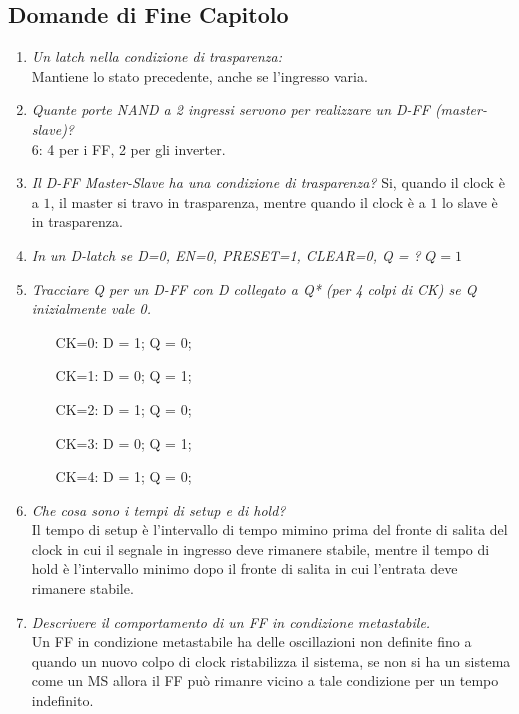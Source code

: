 \documentclass[12pt]{article}
\begin{document}
\subsection{Domande di Fine Capitolo}
\begin{enumerate}
    \item \emph{Un latch nella condizione di trasparenza:} \\
        Mantiene lo stato precedente, anche se l’ingresso varia.

    \item \emph{Quante porte NAND a 2 ingressi servono per realizzare un D-FF (master-slave)?} \\
        6: 4 per i FF, 2 per gli inverter.

    \item \emph{Il D-FF Master-Slave ha una condizione di trasparenza?}
        Si, quando il clock \`e a $1$, il master si travo in trasparenza, mentre quando il clock \`e a $1$ lo slave \`e in trasparenza.

    \item \emph{In un D-latch se D=0, EN=0, PRESET=1, CLEAR=0, Q = ?}
        $Q = 1$

    \item \emph{Tracciare Q per un D-FF con D collegato a Q* (per 4 colpi di CK) se Q inizialmente vale 0.}
        \begin{itemize}
            \item[CK=0:] D = 1; Q = 0;
            \item[CK=1:] D = 0; Q = 1;
            \item[CK=2:] D = 1; Q = 0;
            \item[CK=3:] D = 0; Q = 1;
            \item[CK=4:] D = 1; Q = 0;
        \end{itemize}

    \item \emph{Che cosa sono i tempi di setup e di hold?} \\
        Il tempo di setup \`e l'intervallo di tempo mimino prima del fronte di salita del clock in cui il segnale in ingresso deve rimanere stabile, mentre il tempo di hold \`e l'intervallo minimo dopo il fronte di salita in cui l'entrata deve rimanere stabile.

    \item \emph{Descrivere il comportamento di un FF in condizione metastabile.} \\
        Un FF in condizione metastabile ha delle oscillazioni non definite fino a quando un nuovo colpo di clock ristabilizza il sistema, se non si ha un sistema come un MS allora il FF pu\`o rimanre vicino a tale condizione per un tempo indefinito.
\end{enumerate}
\end{document}

